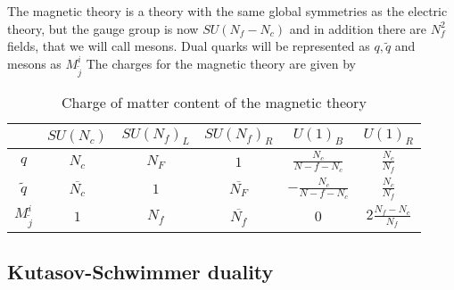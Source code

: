 The magnetic theory is a theory with the same global symmetries as the electric theory, but the gauge group is now $SU(N_f - N_c)$ and in addition there are $N_f^2$ fields, that we will call mesons. 
Dual quarks will be represented as $q,\tilde{q}$ and mesons as $M^i_{\tilde{j}} $
The charges for the magnetic theory are given by


\begin{table}[h!]
 \begin{tabular}{c | c |  c c c c }
 & $SU(N_c) $& $SU(N_f)_L$  &$SU(N_f)_R $  & $U(1)_B$ &  $U(1)_R$ \\
\hline
$q$ & $N_c$ & $N_F$ & $1$   &  $ \frac{N_c}{N-f-N_c} $  & $ \frac{N_c}{N_f}$  \\
$\tilde{q}$ &$\overline{N_c} $ &  $1$ & $\overline{ N_F}$   & $- \frac{N_c}{N-f-N_c}$   &  $ \frac{N_c}{N_f}$   \\	 
$M^i_{\tilde{j}} $ & $1$ & $N_f$ & $\overline{N_f} $ & $0$ & $ 2 \frac{N_f - N_c}{N_f} $
 \end{tabular}
	\centering
 \caption{Charge of matter content of the magnetic theory}
\end{table}


\subsection*{Kutasov-Schwimmer duality}



%